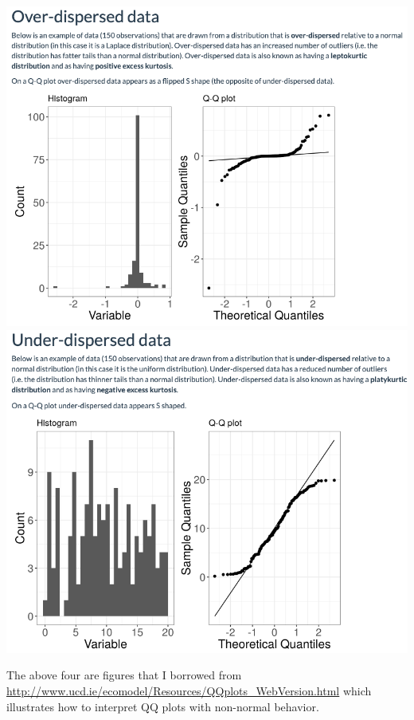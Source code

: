 \documentclass[11pt]{article}
\begin{document}
\begin{center}
    \includegraphics[scale=0.26]{img/qq_over.png}
    \includegraphics[scale=0.26]{img/qq_under.png}
\end{center}
The above four are figures that I borrowed from \url{http://www.ucd.ie/ecomodel/Resources/QQplots_WebVersion.html} which illustrates how to interpret QQ plots with non-normal behavior.
\end{document}

